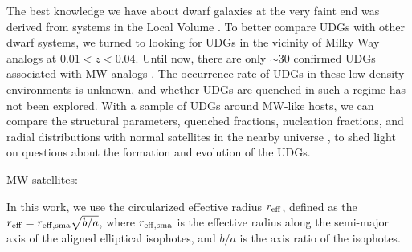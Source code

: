 \documentclass[twocolumn,astrosymb,twocolappendix]{aastex631}
\begin{document}
\begin{CJK*}{UTF8}{gbsn}
The best knowledge we have about dwarf galaxies at the very faint end was derived from systems in the Local Volume \citep[e.g.,][]{Simon2019,CarlstenELVES2022}. To better compare UDGs with other dwarf systems, we turned to looking for UDGs in the vicinity of Milky Way analogs at $0.01 < z < 0.04$. Until now, there are only $\sim 30$ confirmed UDGs associated with MW analogs \citep{Cohen2018,SAGA-II,CarlstenELVES2022}. The occurrence rate of UDGs in these low-density environments is unknown, and whether UDGs are quenched in such a regime has not been explored. With a sample of UDGs around MW-like hosts, we can compare the structural parameters, quenched fractions, nucleation fractions, and radial distributions with normal satellites in the nearby universe \citep[e.g.,][]{SAGA-II,CarlstenELVES2022}, to shed light on questions about the formation and evolution of the UDGs.



MW satellites: \citep{Nashimoto2022}

In this work, we use the circularized effective radius $r_{\rm eff}$, defined as the $r_{\rm eff} = r_{\rm eff, sma} \sqrt{b/a}$, where $r_{\rm eff, sma}$ is the effective radius along the semi-major axis of the aligned elliptical isophotes, and $b/a$ is the axis ratio of the isophotes.


\end{CJK*}
\end{document}
